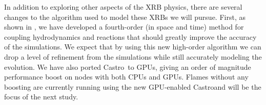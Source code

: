 \documentclass[trackchanges,preprint,times,tighten]{aastex63}
\newcommand{\castro}{{\sf Castro}}
\newcommand{\pynucastro}{{\sf pynucastro}}
\newcommand{\MarginPar}[1]{
    \marginpar{\vskip-\baselineskip%
               \raggedright%
               \tiny\sffamily%
               {\color{red}\hrule%
               \smallskip%
               #1\par%
               \smallskip%
               \hrule}}%
}
\begin{document}




In addition to exploring other aspects of the XRB physics, there are several changes to the algorithm used to
model these XRBs we will pursue.  First, as shown in \citet{castro-sdc}, we have
developed a fourth-order (in space and time) method for coupling
hydrodynamics and reactions that should greatly improve the accuracy
of the simulations.  We expect that by using this new high-order
algorithm we can drop a level of refinement from the simulations while
still accurately modeling the evolution.  We have also ported
\castro\ to GPUs, giving an order of magnitude performance boost on
nodes with both CPUs and GPUs.  Flames without any boosting are currently running
using the new GPU-enabled \castro and will be the focus of the next study.

\end{document}
